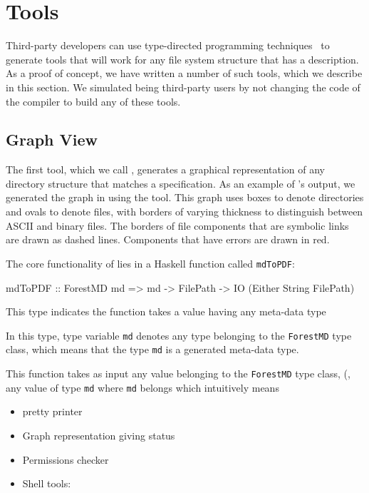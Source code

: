 \section{Tools}
\label{sec:tools}
Third-party developers can use type-directed programming techniques~\cite{??} to
generate tools that will work for any file system structure that has a
\forest{} description.  As a proof of concept, we have written a
number of such tools, which we describe in this section.  We simulated
being third-party users by not changing the code of the \forest{}
compiler to build any of these tools.

\subsection{Graph View}
The first tool, which we call \fg{}, generates a graphical
representation of any directory structure that matches a 
\forest{} specification.  As an example of \fg{}'s
output, we generated the graph in  using 
the tool.  This graph uses boxes to denote directories and ovals to
denote files, with borders of varying thickness to distinguish between
ASCII and binary files.  The borders of file components that are
symbolic links are drawn as dashed lines.  Components that have errors
are drawn in red. 

The core functionality of \fg{} lies in a Haskell function
called \texttt{mdToPDF}:

\begin{code}
mdToPDF :: ForestMD md => 
     md -> FilePath -> IO (Either String FilePath)
\end{code}
This type indicates the function takes a value having any \forest{}
meta-data type

In this type, type variable \texttt{md} denotes any type belonging to
the \texttt{ForestMD} type class, which means that the type
\texttt{md} is a generated \forest{} meta-data type. 

This function takes as input any value belonging to the
\texttt{ForestMD} type class, (\ie, any value of type \texttt{md}
where \texttt{md} belongs 
which intuitively means \texttt{}

\begin{itemize}
\item pretty printer
\item Graph representation giving status
\item Permissions checker
\item Shell tools: 
\end{itemize}
